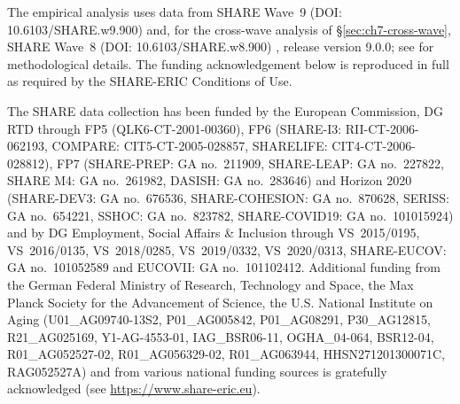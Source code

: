The empirical analysis uses data from SHARE Wave~9 (DOI: 10.6103/SHARE.w9.900) \citep{share_w9_2024} and, for the cross-wave analysis of \S\ref{sec:ch7-cross-wave}, SHARE Wave~8 (DOI: 10.6103/SHARE.w8.900) \citep{share_w8_2024}, release version 9.0.0; see \citet{borschsupan2013} for methodological details. The funding acknowledgement below is reproduced in full as required by the SHARE-ERIC Conditions of Use.

The SHARE data collection has been funded by the European Commission, DG RTD through FP5 (QLK6-CT-2001-00360), FP6 (SHARE-I3: RII-CT-2006-062193, COMPARE: CIT5-CT-2005-028857, SHARELIFE: CIT4-CT-2006-028812), FP7 (SHARE-PREP: GA no.~211909, SHARE-LEAP: GA no.~227822, SHARE M4: GA no.~261982, DASISH: GA no.~283646) and Horizon 2020 (SHARE-DEV3: GA no.~676536, SHARE-COHESION: GA no.~870628, SERISS: GA no.~654221, SSHOC: GA no.~823782, SHARE-COVID19: GA no.~101015924) and by DG Employment, Social Affairs \& Inclusion through VS~2015/0195, VS~2016/0135, VS~2018/0285, VS~2019/0332, VS~2020/0313, SHARE-EUCOV: GA no.~101052589 and EUCOVII: GA no.~101102412. Additional funding from the German Federal Ministry of Research, Technology and Space, the Max Planck Society for the Advancement of Science, the U.S. National Institute on Aging (U01\_AG09740-13S2, P01\_AG005842, P01\_AG08291, P30\_AG12815, R21\_AG025169, Y1-AG-4553-01, IAG\_BSR06-11, OGHA\_04-064, BSR12-04, R01\_AG052527-02, R01\_AG056329-02, R01\_AG063944, HHSN271201300071C, RAG052527A) and from various national funding sources is gratefully acknowledged (see \url{https://www.share-eric.eu}).
